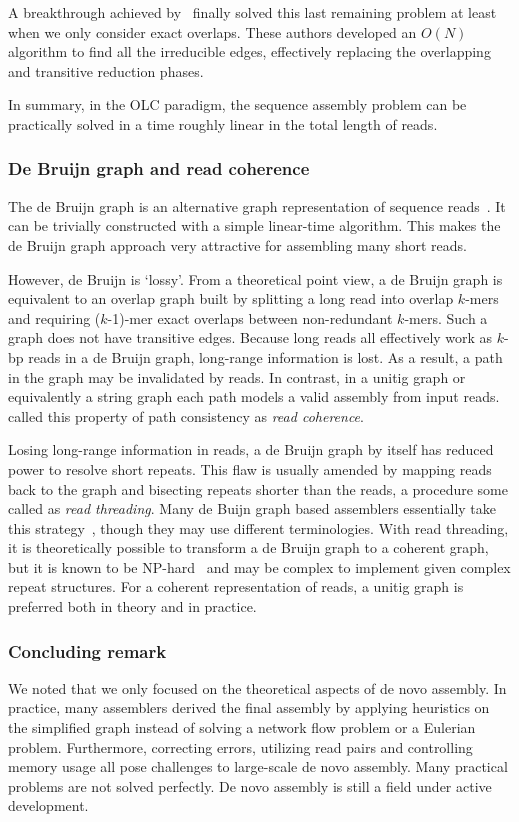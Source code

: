 \documentclass{bioinfo}
\begin{document}
\begin{methods}
A breakthrough achieved by~\citet{Simpson:2010uq} finally solved
this last remaining problem at least when we only consider exact overlaps.
These authors developed an $O(N)$ algorithm to find all the irreducible edges,
effectively replacing the overlapping and transitive reduction phases.

In summary, in the OLC paradigm, the sequence assembly problem can be
practically solved in a time roughly linear in the total length of reads.

\subsubsection{De Bruijn graph and read coherence}
The de Bruijn graph is an alternative graph representation of sequence
reads~\citep{Idury:1995oq}.  It can be trivially constructed with a simple
linear-time algorithm. This makes the de Bruijn graph approach very attractive
for assembling many short reads.

However, de Bruijn is `lossy'. From a theoretical point view, a de Bruijn graph
is equivalent to an overlap graph built by splitting a long read into overlap
$k$-mers and requiring ($k$-1)-mer exact overlaps between non-redundant
$k$-mers.  Such a graph does not have transitive edges. Because long reads all
effectively work as $k$-bp reads in a de Bruijn graph, long-range information
is lost. As a result, a path in the graph may be invalidated by reads. In
contrast, in a unitig graph or equivalently a string graph each path models a
valid assembly from input reads. \citet{Myers:2005bh} called this property of
path consistency as \emph{read coherence}.

Losing long-range information in reads, a de Bruijn graph by itself has
reduced power to resolve short repeats. This flaw is usually amended by mapping
reads back to the graph and bisecting repeats shorter than the reads, a procedure
some called as \emph{read threading}. Many de Buijn graph based assemblers
essentially take this
strategy~\citep{Pevzner:2001vn,Chaisson:2009fk,Zerbino:2009ly,Li:2010vn},
though they may use different terminologies.  With read threading, it is
theoretically possible to transform a de Bruijn graph to a coherent graph, but
it is known to be NP-hard~\citep{DBLP:conf/wabi/MedvedevGMB07} and may be
complex to implement given complex repeat structures. For a coherent
representation of reads, a unitig graph is preferred both in theory and in
practice.

\subsubsection{Concluding remark}
We noted that we only focused on the theoretical aspects of de novo assembly.
In practice, many assemblers derived the final assembly by applying heuristics
on the simplified graph instead of solving a network flow problem or a Eulerian
problem. Furthermore, correcting errors, utilizing read pairs and controlling memory
usage all pose challenges to large-scale de novo assembly. Many practical
problems are not solved perfectly. De novo assembly is still a field under
active development.


\end{methods}
\end{document}
